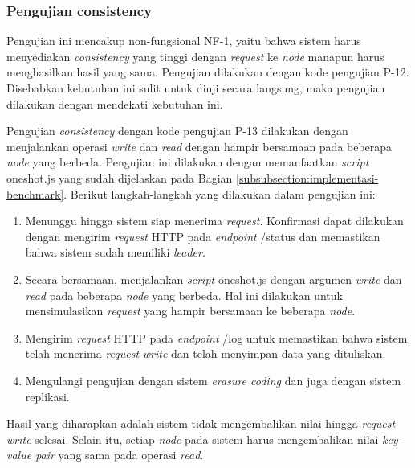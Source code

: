 \subsubsection{Pengujian consistency}
\label{subsubsection:pengujian-consistency}

Pengujian ini mencakup non-fungsional NF-1, yaitu bahwa sistem harus menyediakan \textit{consistency} yang tinggi dengan \textit{request} ke \textit{node} manapun harus menghasilkan hasil yang sama. Pengujian dilakukan dengan kode pengujian P-12. Disebabkan kebutuhan ini sulit untuk diuji secara langsung, maka pengujian dilakukan dengan mendekati kebutuhan ini.

Pengujian \textit{consistency} dengan kode pengujian P-13 dilakukan dengan menjalankan operasi \textit{write} dan \textit{read} dengan hampir bersamaan pada beberapa \textit{node} yang berbeda. Pengujian ini dilakukan dengan memanfaatkan \textit{script} oneshot.js yang sudah dijelaskan pada Bagian \ref{subsubsection:implementasi-benchmark}. Berikut langkah-langkah yang dilakukan dalam pengujian ini:

\begin{enumerate}
	\item Menunggu hingga sistem siap menerima \textit{request}. Konfirmasi dapat dilakukan dengan mengirim \textit{request} HTTP pada \textit{endpoint} /status dan memastikan bahwa sistem sudah memiliki \textit{leader}.
	\item Secara bersamaan, menjalankan \textit{script} oneshot.js dengan argumen \textit{write} dan \textit{read} pada beberapa \textit{node} yang berbeda. Hal ini dilakukan untuk mensimulasikan \textit{request} yang hampir bersamaan ke beberapa \textit{node}.
	\item Mengirim \textit{request} HTTP pada \textit{endpoint} /log untuk memastikan bahwa sistem telah menerima \textit{request} \textit{write} dan telah menyimpan data yang dituliskan.
	\item Mengulangi pengujian dengan sistem \textit{erasure coding} dan juga dengan sistem replikasi.
\end{enumerate}

Hasil yang diharapkan adalah sistem tidak mengembalikan nilai hingga \textit{request} \textit{write} selesai. Selain itu, setiap \textit{node} pada sistem harus mengembalikan nilai \textit{key-value pair} yang sama pada operasi \textit{read}.
